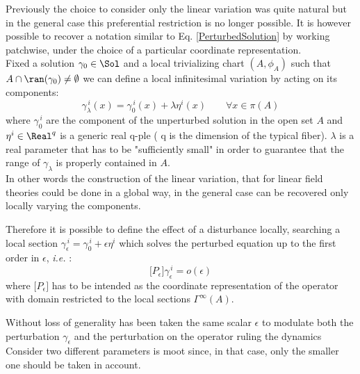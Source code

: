 \documentclass[Main]{subfiles}
\begin{document}
		Previously the choice to consider only the linear variation was quite natural but in the general case this preferential restriction is no longer possible.
		It is however possible to  recover a notation similar to Eq. \ref{PerturbedSolution} by working patchwise, under the choice of a particular coordinate representation.
		\\
		Fixed a solution $\gamma_0 \in \Sol$ and a local trivializing chart $(A, \phi_A)$ such that $A\cap \ran(\gamma_0) \neq \emptyset$ we can define a local infinitesimal variation by acting on its components:
		\begin{displaymath}
			\gamma_\lambda ^{\, i}(x) = \gamma_0^{\, i}(x) + \lambda \eta^i(x) \qquad \forall x\in \pi(A)
		\end{displaymath}
		where $ \gamma_0^{\, i}$ are the component of the unperturbed solution in the open set $A$ and $\eta^i\in \Real^q$ is a generic real q-ple ( q is the dimension of the typical fiber).
		$\lambda$ is a real parameter that has to be "sufficiently small" in order to guarantee that the range of $\gamma_\lambda$ is properly contained in $A$.
		\\
		In other words the construction of the linear variation, that for linear field theories could be done in a global way, in the general case can be recovered only locally varying the components.
		
		Therefore it is possible to define the effect of a disturbance locally, searching a local section $\gamma_\epsilon^{\, i} = \gamma_0^{\, i} + \epsilon \eta^{i}$ which solves  the perturbed equation up to the first order in $\epsilon$, \textit{i.e.} : 
		\begin{displaymath}
			\big[ P_\epsilon \big] \gamma_\epsilon^{\,i} = o(\epsilon)
		\end{displaymath}
		where $\big[ P_\epsilon \big] $ has to be intended as the coordinate representation of the operator with domain restricted to the local sections $\Gamma^\infty(A)$.
		
		\vspace{2mm}
		Without loss of generality has been taken the same scalar $\epsilon$  to modulate both the perturbation $\gamma_\epsilon$ and the %
		perturbation on the operator ruling the dynamics
		\\	
		Consider two different parameters is moot since, in that case, only the smaller one should be taken in account.
\end{document}
